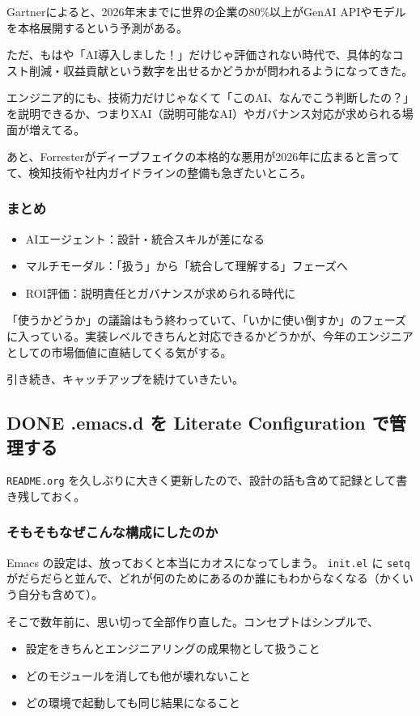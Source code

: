\documentclass[11pt]{article}
\begin{document}
Gartnerによると、2026年末までに世界の企業の80\%以上がGenAI APIやモデルを本格展開するという予測がある。

ただ、もはや「AI導入しました！」だけじゃ評価されない時代で、具体的なコスト削減・収益貢献という数字を出せるかどうかが問われるようになってきた。

エンジニア的にも、技術力だけじゃなくて「このAI、なんでこう判断したの？」を説明できるか、つまりXAI（説明可能なAI）やガバナンス対応が求められる場面が増えてる。

あと、Forresterがディープフェイクの本格的な悪用が2026年に広まると言ってて、検知技術や社内ガイドラインの整備も急ぎたいところ。
\subsubsection{まとめ}
\label{sec:org81bc61d}

\begin{itemize}
\item AIエージェント：設計・統合スキルが差になる
\item マルチモーダル：「扱う」から「統合して理解する」フェーズへ
\item ROI評価：説明責任とガバナンスが求められる時代に
\end{itemize}

「使うかどうか」の議論はもう終わっていて、「いかに使い倒すか」のフェーズに入っている。実装レベルできちんと対応できるかどうかが、今年のエンジニアとしての市場価値に直結してくる気がする。

引き続き、キャッチアップを続けていきたい。
\subsection{{\bfseries\sffamily DONE} .emacs.d を Literate Configuration で管理する}
\label{sec:org61a945c}
\texttt{README.org} を久しぶりに大きく更新したので、設計の話も含めて記録として書き残しておく。
\subsubsection{そもそもなぜこんな構成にしたのか}
\label{sec:org3c0c881}

Emacs の設定は、放っておくと本当にカオスになってしまう。 \texttt{init.el} に \texttt{setq} がだらだらと並んで、どれが何のためにあるのか誰にもわからなくなる（かくいう自分も含めて）。

そこで数年前に、思い切って全部作り直した。コンセプトはシンプルで、

\begin{itemize}
\item 設定をきちんとエンジニアリングの成果物として扱うこと
\item どのモジュールを消しても他が壊れないこと
\item どの環境で起動しても同じ結果になること
\end{itemize}
\end{document}
